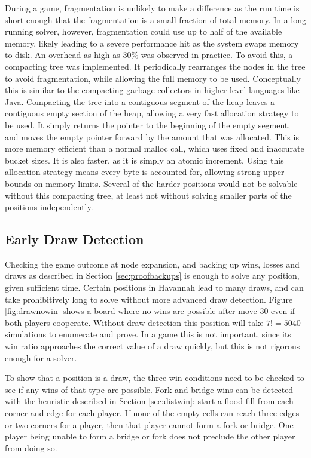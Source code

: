 During a game, fragmentation is unlikely to make a difference as the run time is short enough that the fragmentation is a small fraction of total memory. In a long running solver, however, fragmentation could use up to half of the available memory, likely leading to a severe performance hit as the system swaps memory to disk. An overhead as high as 30\% was observed in practice. To avoid this, a compacting tree was implemented. It periodically rearranges the nodes in the tree to avoid fragmentation, while allowing the full memory to be used. Conceptually this is similar to the compacting garbage collectors in higher level languages like Java. Compacting the tree into a contiguous segment of the heap leaves a contiguous empty section of the heap, allowing a very fast allocation strategy to be used. It simply returns the pointer to the beginning of the empty segment, and moves the empty pointer forward by the amount that was allocated. This is more memory efficient than a normal malloc call, which uses fixed and inaccurate bucket sizes. It is also faster, as it is simply an atomic increment. Using this allocation strategy means every byte is accounted for, allowing strong upper bounds on memory limits. Several of the harder positions would not be solvable without this compacting tree, at least not without solving smaller parts of the positions independently.

\subsection{Early Draw Detection}\label{sec:drawdetect}

Checking the game outcome at node expansion, and backing up wins, losses and draws as described in Section \ref{sec:proofbackups} is enough to solve any position, given sufficient time. Certain positions in Havannah lead to many draws, and can take prohibitively long to solve without more advanced draw detection. Figure \ref{fig:drawnowin} shows a board where no wins are possible after move 30 even if both players cooperate. Without draw detection this position will take $7!=5040$ simulations to enumerate and prove. In a game this is not important, since its win ratio approaches the correct value of a draw quickly, but this is not rigorous enough for a solver.

To show that a position is a draw, the three win conditions need to be checked to see if any wins of that type are possible. Fork and bridge wins can be detected with the heuristic described in Section \ref{sec:distwin}: start a flood fill from each corner and edge for each player. If none of the empty cells can reach three edges or two corners for a player, then that player cannot form a fork or bridge. One player being unable to form a bridge or fork does not preclude the other player from doing so.


